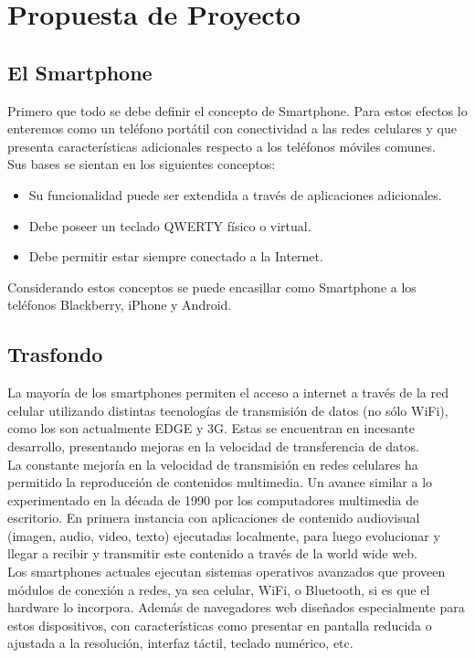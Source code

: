 \section{Propuesta de Proyecto}
\subsection{El Smartphone}
Primero que todo se debe definir el concepto de Smartphone. Para estos efectos lo enteremos como un teléfono portátil con conectividad a las redes celulares y que presenta características adicionales respecto a los teléfonos móviles comunes.\\

Sus bases se sientan en los siguientes conceptos:
\begin{itemize}
\item Su funcionalidad puede ser extendida a través de aplicaciones adicionales.
\item Debe poseer un teclado QWERTY físico o virtual.
\item Debe permitir estar siempre conectado a la Internet.
\end{itemize}
Considerando estos conceptos se puede encasillar como Smartphone a los teléfonos Blackberry, iPhone y Android.

\subsection{Trasfondo}
La mayoría de los smartphones permiten el acceso a internet a través de la red celular utilizando distintas tecnologías de transmisión de datos (no sólo WiFi), como los son actualmente EDGE y 3G. Estas se encuentran en incesante desarrollo, presentando mejoras en la velocidad de transferencia de datos.\\

La constante mejoría en la velocidad de transmisión en redes celulares ha permitido la reproducción de contenidos multimedia. Un avance similar a lo experimentado en la década de 1990 por los computadores multimedia de escritorio. En primera instancia con aplicaciones de contenido audiovisual (imagen, audio, video, texto) ejecutadas localmente, para luego evolucionar y llegar a recibir y transmitir este contenido a través de la world wide web.\\

Los smartphones actuales ejecutan sistemas operativos avanzados que proveen módulos de conexión  a redes, ya sea celular, WiFi, o Bluetooth, si es que el hardware lo incorpora. Además de navegadores web diseñados especialmente para estos dispositivos, con características como presentar en pantalla reducida o ajustada a la resolución, interfaz táctil, teclado numérico, etc.\\

